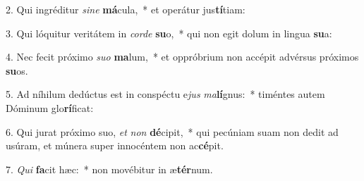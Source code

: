 2. Qui ingréditur \textit{si}\textit{ne} \textbf{má}cula,~*  et operátur jus\textbf{tí}tiam:\

3. Qui lóquitur veritátem in \textit{cor}\textit{de} \textbf{su}o,~*  qui non egit dolum in lingua \textbf{su}a:\

4. Nec fecit próximo \textit{su}\textit{o} \textbf{ma}lum,~*  et oppróbrium non accépit advérsus próximos \textbf{su}os.\

5. Ad níhilum dedúctus est in conspéctu e\textit{jus} \textit{ma}\textbf{lí}gnus:~*  timéntes autem Dóminum glo\textbf{rí}ficat:\

6. Qui jurat próximo suo, \textit{et} \textit{non} \textbf{dé}cipit,~*  qui pecúniam suam non dedit ad usúram, et múnera super innocéntem non ac\textbf{cé}pit.\

7. \textit{Qui} \textbf{fa}cit hæc:~*  non movébitur in æ\textbf{tér}num.\

